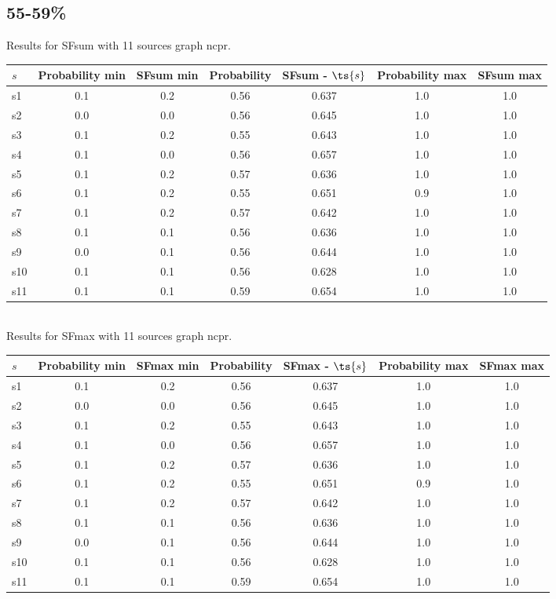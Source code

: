 \documentclass{article}
\begin{document}
\newpage

\subsection{55-59\%}

\noindent Results for SFsum with 11 sources graph ncpr.

\noindent\begin{tabular}{|l|c|c|c|c|c|c|}
\hline
$s$& Probability min & SFsum min & Probability & SFsum - $\ts{s}$ & Probability max & SFsum max\\
\hline
s1 &0.1 & 0.2 & 0.56 & 0.637 & 1.0 & 1.0\\
\hline
s2 &0.0 & 0.0 & 0.56 & 0.645 & 1.0 & 1.0\\
\hline
s3 &0.1 & 0.2 & 0.55 & 0.643 & 1.0 & 1.0\\
\hline
s4 &0.1 & 0.0 & 0.56 & 0.657 & 1.0 & 1.0\\
\hline
s5 &0.1 & 0.2 & 0.57 & 0.636 & 1.0 & 1.0\\
\hline
s6 &0.1 & 0.2 & 0.55 & 0.651 & 0.9 & 1.0\\
\hline
s7 &0.1 & 0.2 & 0.57 & 0.642 & 1.0 & 1.0\\
\hline
s8 &0.1 & 0.1 & 0.56 & 0.636 & 1.0 & 1.0\\
\hline
s9 &0.0 & 0.1 & 0.56 & 0.644 & 1.0 & 1.0\\
\hline
s10 &0.1 & 0.1 & 0.56 & 0.628 & 1.0 & 1.0\\
\hline
s11 &0.1 & 0.1 & 0.59 & 0.654 & 1.0 & 1.0\\
\hline
\end{tabular}\\

\noindent Results for SFmax with 11 sources graph ncpr.

\noindent\begin{tabular}{|l|c|c|c|c|c|c|}
\hline
$s$& Probability min & SFmax min & Probability & SFmax - $\ts{s}$ & Probability max & SFmax max\\
\hline
s1 &0.1 & 0.2 & 0.56 & 0.637 & 1.0 & 1.0\\
\hline
s2 &0.0 & 0.0 & 0.56 & 0.645 & 1.0 & 1.0\\
\hline
s3 &0.1 & 0.2 & 0.55 & 0.643 & 1.0 & 1.0\\
\hline
s4 &0.1 & 0.0 & 0.56 & 0.657 & 1.0 & 1.0\\
\hline
s5 &0.1 & 0.2 & 0.57 & 0.636 & 1.0 & 1.0\\
\hline
s6 &0.1 & 0.2 & 0.55 & 0.651 & 0.9 & 1.0\\
\hline
s7 &0.1 & 0.2 & 0.57 & 0.642 & 1.0 & 1.0\\
\hline
s8 &0.1 & 0.1 & 0.56 & 0.636 & 1.0 & 1.0\\
\hline
s9 &0.0 & 0.1 & 0.56 & 0.644 & 1.0 & 1.0\\
\hline
s10 &0.1 & 0.1 & 0.56 & 0.628 & 1.0 & 1.0\\
\hline
s11 &0.1 & 0.1 & 0.59 & 0.654 & 1.0 & 1.0\\
\hline
\end{tabular}\\
\end{document}
